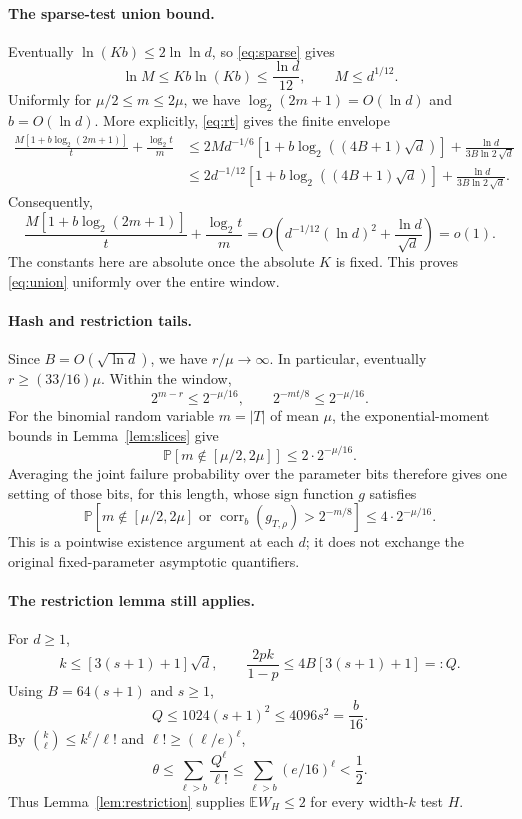 \documentclass[11pt,letterpaper]{article}
\theoremstyle{definition}
\numberwithin{equation}{section}
\newcommand{\E}{\mathbb E}
\newcommand{\Prb}{\mathbb P}
\DeclareMathOperator{\corr}{corr}
\begin{document}
\paragraph{The sparse-test union bound.}
Eventually $\ln(Kb)\le2\ln\ln d$, so \eqref{eq:sparse} gives
\[
 \ln M\le Kb\ln(Kb)\le\frac{\ln d}{12},\qquad M\le d^{1/12}.
\]
Uniformly for $\mu/2\le m\le2\mu$, we have
$\log_2(2m+1)=O(\ln d)$ and $b=O(\ln d)$.
More explicitly, \eqref{eq:rt} gives the finite envelope
\begin{align*}
 \frac{M[1+b\log_2(2m+1)]}{t}+\frac{\log_2t}{m}
 &\le 2M d^{-1/6}
       [1+b\log_2((4B+1)\sqrt d)]
       +\frac{\ln d}{3B\ln2\,\sqrt d}\\
 &\le 2d^{-1/12}
       [1+b\log_2((4B+1)\sqrt d)]
       +\frac{\ln d}{3B\ln2\,\sqrt d}.
\end{align*}
Consequently,
\[
 \frac{M[1+b\log_2(2m+1)]}{t}
       +\frac{\log_2t}{m}
 =O\!\left(d^{-1/12}(\ln d)^2
                   +\frac{\ln d}{\sqrt d}\right)=o(1).
\]
The constants here are absolute once the absolute $K$ is fixed.
This proves \eqref{eq:union} uniformly over the entire window.

\paragraph{Hash and restriction tails.}
Since $B=O(\sqrt{\ln d})$, we have $r/\mu\to\infty$.
In particular, eventually $r\ge(33/16)\mu$. Within the window,
\[
 2^{m-r}\le2^{-\mu/16},\qquad
 2^{-mt/8}\le2^{-\mu/16}.
\]
For the binomial random variable $m=|T|$ of mean $\mu$, the
exponential-moment bounds in Lemma~\ref{lem:slices} give
\[
 \Prb[m\notin[\mu/2,2\mu]]\le2\cdot2^{-\mu/16}.
\]
Averaging the joint failure probability over the parameter bits therefore
gives one setting of those bits, for this length, whose sign function $g$
satisfies
\begin{equation}\label{eq:good}
 \Prb\left[m\notin[\mu/2,2\mu]
       \text{ or }\corr_b(g_{T,\rho})>2^{-m/8}\right]
       \le4\cdot2^{-\mu/16}.
\end{equation}
This is a pointwise existence argument at each $d$; it does not exchange
the original fixed-parameter asymptotic quantifiers.

\paragraph{The restriction lemma still applies.}
For $d\ge1$,
\[
 k\le[3(s+1)+1]\sqrt d,\qquad
 \frac{2pk}{1-p}\le4B[3(s+1)+1]=:Q.
\]
Using $B=64(s+1)$ and $s\ge1$,
\[
 Q\le1024(s+1)^2\le4096s^2=\frac b{16}.
\]
By $\binom{k}{\ell}\le k^\ell/\ell!$ and
$\ell!\ge(\ell/e)^\ell$,
\[
 \theta\le\sum_{\ell>b}\frac{Q^\ell}{\ell!}
 \le\sum_{\ell>b}(e/16)^\ell<\frac12.
\]
Thus Lemma~\ref{lem:restriction} supplies $\E W_H\le2$ for every width-$k$ test $H$.
\end{document}
